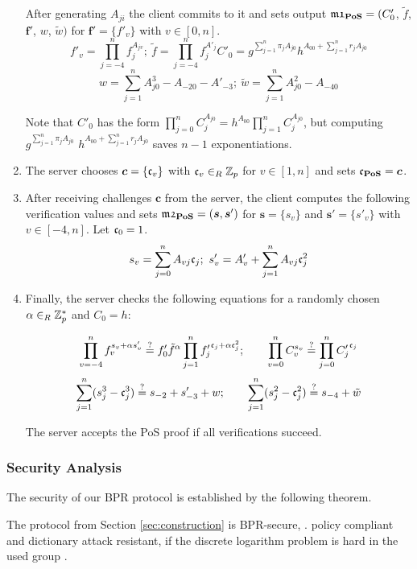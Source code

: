 \begin{enumerate}
\noindent
After generating $A_{ji}$ the client commits to it and sets output $\mathfrak{m1}_\mathsf{\bf PoS}=(C'_0$, $\tilde{f}$, $\bm f'$, $w$, $\tilde{w})$ for $\bm f'=\{f'_v\}$ with $v\in[0,n]$.
\[ 
 f'_v=\prod_{j=-4}^{n} f_j^{A_{jv}};~ \tilde{f}=\prod_{j=-4}^{n} f_j^{A'_{j}}
 C'_0=g^{\sum_{j=1}^{n} \pi_j A_{j0}} h^{A_{00}+\sum_{j=1}^{n} r_jA_{j0}}
\] 
\[w=\sum_{j=1}^n A_{j0}^3-A_{-20}-A'_{-3};~ \tilde{w}=\sum_{j=1}^n A_{j0}^2 - A_{-40} \]

\noindent
Note that $C'_0$ has the form $\prod_{j=0}^n C_j^{A_{j0}}=h^{A_{00}}\prod_{j=1}^n C_j^{A_{j0}}$, but computing $g^{\sum_{j=1}^{n} \pi_j A_{j0}}$ $h^{A_{00}+\sum_{j=1}^{n} r_jA_{j0}}$ saves $n-1$ exponentiations.


\item The server chooses $\bm c = \{\mathfrak{c}_v\}$ with $\mathfrak{c}_v\in_R\mathbb{Z}_p$ for $v\in[1,n]$ and sets $\mathfrak{c}_\mathsf{\bf PoS}=\bm c$.

\item After receiving challenges $\bm c$ from the server, the client computes the following verification values and sets \allowbreak $\mathfrak{m2}_\mathsf{\bf PoS}=(\bm s, \bm s')$ for $\bm s = \{s_v\}$ and $\bm s' = \{s'_v\}$ with $v\in[-4,n]$.
Let $\mathfrak{c}_0=1$.
\[ s_v = \sum_{j=0}^{n} A_{vj}\mathfrak{c}_j;~ s'_v = A'_v + \sum_{j=1}^{n} A_{vj}\mathfrak{c}_j^2 \] %


\item Finally, the server checks the following equations for a randomly chosen $\alpha\in_R\mathbb{Z}^\ast_p$ and $C_0=h$:

\[  \prod_{v=-4}^{n} f_v^{s_v+\alpha s'_v} \stackrel{?}{=} f'_0\tilde{f}^\alpha \prod_{j=1}^n {f'_j}^{\mathfrak{c}_j+\alpha \mathfrak{c}_j^2};\hspace*{2em}
    \prod_{v=0}^n C_v^{s_v} \stackrel{?}{=} \prod_{j=0}^n {C'_j}^{\mathfrak{c}_j} \]
\[  \sum_{j=1}^n (s_j^3 - \mathfrak{c}_j^3) \stackrel{?}{=} s_{-2} + s'_{-3} + w;\hspace*{2em}
    \sum_{j=1}^n (s_j^2 - \mathfrak{c}_j^2) \stackrel{?}{=} s_{-4} + \tilde{w} \]

\noindent
The server accepts the \ac{PoS} proof if all verifications succeed.
\end{enumerate}

\subsubsection{Security Analysis}
The security of our \ac{BPR} protocol is established by the following theorem. 

\begin{theorem}\label{theo:bpr}
  The protocol from Section \ref{sec:construction} is \ac{BPR}-secure, \ie. policy compliant and dictionary attack resistant, if the discrete logarithm problem is hard in the used group \GG.
\end{theorem}

